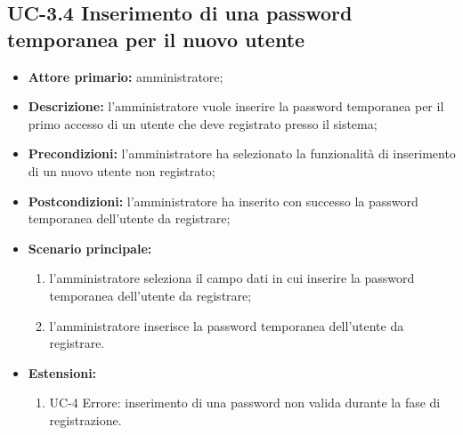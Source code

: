 \subsection{UC-3.4 Inserimento di una password temporanea per il nuovo utente}
\begin{itemize}
	\item \textbf{Attore primario:} amministratore;

	\item \textbf{Descrizione:} l'amministratore vuole inserire la password temporanea per il primo accesso di un utente che deve registrato presso il sistema;

	\item \textbf{Precondizioni:} l'amministratore ha selezionato la funzionalità di inserimento di un nuovo utente non registrato;

	\item \textbf{Postcondizioni:} l'amministratore ha inserito con successo la password temporanea dell'utente da registrare;

	\item \textbf{Scenario principale:}
	      \begin{enumerate}
		      \item l'amministratore seleziona il campo dati in cui inserire la password temporanea dell'utente da registrare;
		      \item l'amministratore inserisce la password temporanea dell'utente da registrare.
	      \end{enumerate}

	\item \textbf{Estensioni:}
	      \begin{enumerate}
		      \item UC-4 Errore: inserimento di una password non valida durante la fase di registrazione.
	      \end{enumerate}
\end{itemize}

